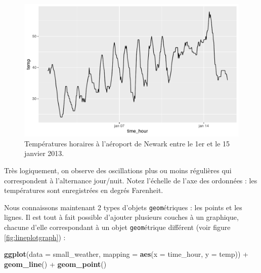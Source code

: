 \documentclass[a4paperpaper,]{article}
\newenvironment{Shaded}{\begin{snugshade}}{\end{snugshade}}
\newcommand{\DataTypeTok}[1]{\textcolor[rgb]{0.00,0.34,0.68}{#1}}
\newcommand{\KeywordTok}[1]{\textcolor[rgb]{0.12,0.11,0.11}{\textbf{#1}}}
\newcommand{\NormalTok}[1]{\textcolor[rgb]{0.12,0.11,0.11}{#1}}
\newcommand{\OperatorTok}[1]{\textcolor[rgb]{0.12,0.11,0.11}{#1}}
\newcommand{\StringTok}[1]{\textcolor[rgb]{0.75,0.01,0.01}{#1}}
\begin{document}
\begin{figure}[htpb]

{\centering \includegraphics[width=0.9\linewidth]{figure/linegraph-1} 

}

\caption{Températures horaires à l'aéroport de Newark entre le 1er et le 15 janvier 2013.}\label{fig:linegraph}
\end{figure}

Très logiquement, on observe des oscillations plus ou moins régulières qui correspondent à l'alternance jour/nuit. Notez l'échelle de l'axe des ordonnées : les températures sont enregistrées en degrés Farenheit.

Nous connaissons maintenant 2 types d'objets \texttt{geom}étriques : les points et les lignes. Il est tout à fait possible d'ajouter plusieurs couches à un graphique, chacune d'elle correspondant à un objet \texttt{geom}étrique différent (voir figure \ref{fig:lineplotgraph}) :

\begin{Shaded}
\begin{Highlighting}[]
\KeywordTok{ggplot}\NormalTok{(}\DataTypeTok{data =}\NormalTok{ small_weather, }\DataTypeTok{mapping =} \KeywordTok{aes}\NormalTok{(}\DataTypeTok{x =}\NormalTok{ time_hour, }\DataTypeTok{y =}\NormalTok{ temp)) }\OperatorTok{+}
\StringTok{  }\KeywordTok{geom_line}\NormalTok{() }\OperatorTok{+}
\StringTok{  }\KeywordTok{geom_point}\NormalTok{()}
\end{Highlighting}
\end{Shaded}
\end{document}
